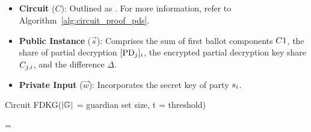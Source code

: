 \documentclass[runningheads]{llncs}
\begin{document}
\subsection{}\label{sec:proof-pds}

\begin{itemize}
    \item \textbf{Circuit} ($C$): Outlined as \ProofPDSInformal{}. For more information, refer to Algorithm~\ref{alg:circuit_proof_pds}.
    \item \textbf{Public Instance} ($\vec{s}$): Comprises the sum of first ballot components $C1{}$, the share of partial decryption $[\mathrm{PD}_{j}]_{i}$, the encrypted partial decryption key share $C_{j,i}$, and the difference $\Delta$.
    \item \textbf{Private Input} ($\vec{w}$): Incorporates the secret key of party $s_{i}$.
\end{itemize}


\begin{algorithm}[H]
\caption{Circuit FDKG($|\mathbb{G}_{}|$ = guardian set size, t = threshold)}
\label{alg:circuit_fdkg}






\BlankLine

\Assert {} = \;

\end{algorithm}
\end{document}
